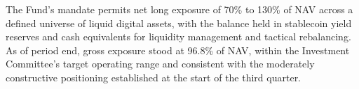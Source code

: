 The Fund's mandate permits net long exposure of 70\% to 130\% of NAV across a defined universe of liquid digital assets, with the balance held in stablecoin yield reserves and cash equivalents for liquidity management and tactical rebalancing. As of period end, gross exposure stood at 96.8\% of NAV, within the Investment Committee's target operating range and consistent with the moderately constructive positioning established at the start of the third quarter.
